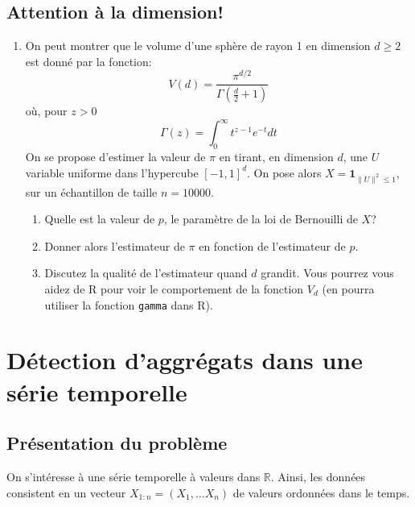 \documentclass[]{article}
\providecommand{\tightlist}{%
  \setlength{\itemsep}{0pt}\setlength{\parskip}{0pt}}
\begin{document}
\hypertarget{attention-uxe0-la-dimension}{%
\subsection{Attention à la
dimension!}\label{attention-uxe0-la-dimension}}

\begin{enumerate}
\def\labelenumi{\arabic{enumi}.}
\setcounter{enumi}{3}
\item
  On peut montrer que le volume d'une sphère de rayon 1 en dimension
  \(d\geq 2\) est donné par la fonction:
  \[V(d) = \frac{\pi^{d / 2}}{\Gamma(\frac{d}{2} + 1)}\] où, pour
  \(z>0\) \[\Gamma(z) = \int_0^\infty t^{z-1} e^{-t} d t\] On se propose
  d'estimer la valeur de \(\pi\) en tirant, en dimension \(d\), une
  \(U\) variable uniforme dans l'hypercube \([-1, 1]^d\). On pose alors
  \(X = \mathbf{1}_{\parallel U \parallel^2 \leq 1}\), sur un
  échantillon de taille \(n = 10000\).

  \begin{enumerate}
  \def\labelenumii{\alph{enumii}.}
  \tightlist
  \item
    Quelle est la valeur de \(p\), le paramètre de la loi de Bernouilli
    de \(X\)?
  \item
    Donner alors l'estimateur de \(\pi\) en fonction de l'estimateur de
    \(p\).
  \item
    Discutez la qualité de l'estimateur quand \(d\) grandit. Vous
    pourrez vous aidez de R pour voir le comportement de la fonction
    \(V_d\) (en pourra utiliser la fonction \texttt{gamma} dans R).
  \end{enumerate}
\end{enumerate}

\hypertarget{duxe9tection-daggruxe9gats-dans-une-suxe9rie-temporelle}{%
\section{Détection d'aggrégats dans une série
temporelle}\label{duxe9tection-daggruxe9gats-dans-une-suxe9rie-temporelle}}

\hypertarget{pruxe9sentation-du-probluxe8me}{%
\subsection{Présentation du
problème}\label{pruxe9sentation-du-probluxe8me}}

On s'intéresse à une série temporelle à valeurs dans \(\mathbb{R}\).
Ainsi, les données consistent en un vecteur
\(X_{1:n} = (X_1,\dots X_n)\) de valeurs ordonnées dans le temps.
\end{document}
